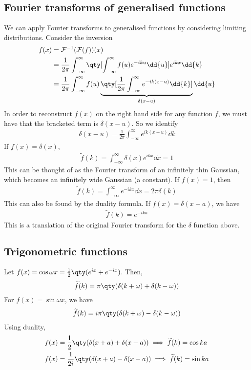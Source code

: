 \subsection{Fourier transforms of generalised functions}
We can apply Fourier transforms to generalised functions by considering limiting distributions.
Consider the inversion
\begin{align*}
	f(x) & = \mathcal F\inv(\mathcal F(f))(x)                                                                                                          \\
	     & = \frac{1}{2\pi} \int_{-\infty}^\infty \qty[\int_{-\infty}^\infty f(u) e^{-iku} \dd{u}] e^{ikx} \dd{k}                                       \\
	     & = \frac{1}{2\pi} \int_{-\infty}^\infty f(u) \underbrace{\qty[\frac{1}{2\pi} \int_{-\infty}^\infty e^{-ik(x-u)} \dd{k}]}_{\delta(x-u)} \dd{u}
\end{align*}
In order to reconstruct $f(x)$ on the right hand side for any function $f$, we must have that the bracketed term is $\delta(x-u)$.
So we identify
\begin{align*}
	\delta(x-u) = \frac{1}{2\pi} \int_{-\infty}^\infty e^{ik(x-u)} \dd{k}
\end{align*}
If $f(x) = \delta(x)$,
\begin{align*}
	\widetilde f(k) = \int_{-\infty}^\infty \delta(x) e^{ikx} \dd{x} = 1
\end{align*}
This can be thought of as the Fourier transform of an infinitely thin Gaussian, which becomes an infinitely wide Gaussian (a constant).
If $f(x) = 1$, then
\begin{align*}
	\widetilde f(k) = \int_{-\infty}^\infty e^{-ikx}\dd{x} = 2\pi \delta(k)
\end{align*}
This can also be found by the duality formula.
If $f(x) = \delta(x - a)$, we have
\begin{align*}
	\widetilde f(k) = e^{-ika}
\end{align*}
This is a translation of the original Fourier transform for the $\delta$ function above.

\subsection{Trigonometric functions}
Let $f(x) = \cos \omega x = \frac{1}{2} \qty(e^{ix} + e^{-ix})$.
Then,
\begin{align*}
	\widetilde f(k) = \pi\qty(\delta(k+\omega) + \delta(k-\omega))
\end{align*}
For $f(x) = \sin \omega x$, we have
\begin{align*}
	\widetilde f(k) = i\pi\qty(\delta(k+\omega) - \delta(k-\omega))
\end{align*}
Using duality,
\begin{align*}
	f(x) & = \frac{1}{2}\qty(\delta(x+a) + \delta(x-a)) \implies \widetilde f(k) = \cos ka  \\
	f(x) & = \frac{1}{2i}\qty(\delta(x+a) - \delta(x-a)) \implies \widetilde f(k) = \sin ka
\end{align*}

